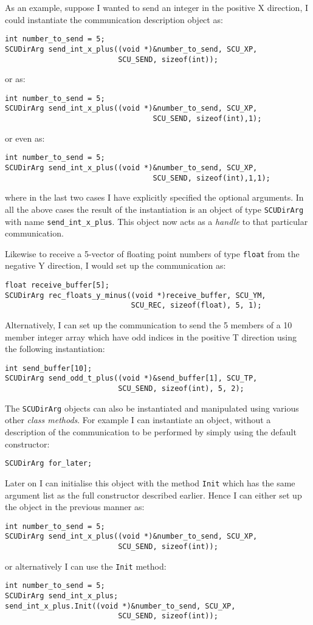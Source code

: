 As an example, suppose I wanted to send an integer in the 
positive X direction, I could instantiate the communication description object as:
\begin{verbatim}
int number_to_send = 5;
SCUDirArg send_int_x_plus((void *)&number_to_send, SCU_XP, 
                          SCU_SEND, sizeof(int));
\end{verbatim}
or as:
\begin{verbatim}
int number_to_send = 5;
SCUDirArg send_int_x_plus((void *)&number_to_send, SCU_XP, 
                                  SCU_SEND, sizeof(int),1);
\end{verbatim}
or even as:
\begin{verbatim}
int number_to_send = 5;
SCUDirArg send_int_x_plus((void *)&number_to_send, SCU_XP, 
                                  SCU_SEND, sizeof(int),1,1);
\end{verbatim}
where in the last two cases I have explicitly specified the optional arguments.
In all the above cases the result of the instantiation is an
object of type {\tt SCUDirArg} with name {\tt send\_int\_x\_plus}. This object
now acts as a {\em handle} to that particular communication.

Likewise to receive a 5-vector of floating point numbers of type {\tt float}
from the negative Y direction, I would set up the communication as:
\begin{verbatim}
float receive_buffer[5];
SCUDirArg rec_floats_y_minus((void *)receive_buffer, SCU_YM, 
                             SCU_REC, sizeof(float), 5, 1);
\end{verbatim}

Alternatively, I can set up the communication to send the 5 members of a 10 member integer array which have odd indices in the positive T direction using the
following instantiation:
\begin{verbatim}
int send_buffer[10];
SCUDirArg send_odd_t_plus((void *)&send_buffer[1], SCU_TP, 
                          SCU_SEND, sizeof(int), 5, 2);
\end{verbatim}

The {\tt SCUDirArg} objects can also be instantiated and manipulated using
various other {\em class methods}. For example I can instantiate an
object, without a description of the communication to be performed 
by simply using the default constructor:
\begin{verbatim}
SCUDirArg for_later;
\end{verbatim}
Later on I can initialise this object with the method {\tt Init}
which has the same argument list as the full constructor described earlier.
Hence I can either set up the object in the previous manner as:
\begin{verbatim}
int number_to_send = 5;
SCUDirArg send_int_x_plus((void *)&number_to_send, SCU_XP, 
                          SCU_SEND, sizeof(int));
\end{verbatim}
or alternatively I can use the {\tt Init} method:
\begin{verbatim}
int number_to_send = 5;
SCUDirArg send_int_x_plus;
send_int_x_plus.Init((void *)&number_to_send, SCU_XP, 
                          SCU_SEND, sizeof(int));
\end{verbatim}

